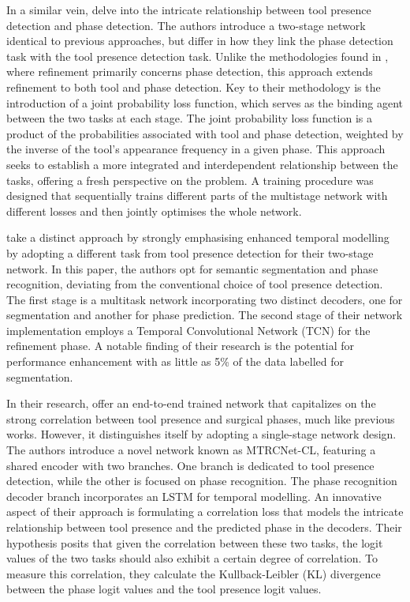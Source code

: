 \documentclass[times,twocolumn,final]{elsarticle}
\begin{document}
In a similar vein, \citet{multitask_connectionism} delve into the intricate relationship between tool presence detection and phase detection. The authors introduce a two-stage network identical to previous approaches, but \citet{multitask_connectionism} differ in how they link the phase detection task with the tool presence detection task.
Unlike the methodologies found in \citep{tecno,twinanda2016lstm,EndoNet}, where refinement primarily concerns phase detection, this approach extends refinement to both tool and phase detection.
Key to their methodology is the introduction of a joint probability loss function, which serves as the binding agent between the two tasks at each stage. The joint probability loss function is a product of the probabilities associated with tool and phase detection, weighted by the inverse of the tool's appearance frequency in a given phase. This approach seeks to establish a more integrated and interdependent relationship between the tasks, offering a fresh perspective on the problem. A training procedure was designed that sequentially trains different parts of the multistage network with different losses and then jointly optimises the whole network.

\citet{Sanchez-Matilla2022_data_centric} take a distinct approach by strongly emphasising enhanced temporal modelling by adopting a different task from tool presence detection for their two-stage network. In this paper, the authors opt for semantic segmentation and phase recognition, deviating from the conventional choice of tool presence detection.
The first stage is a multitask network incorporating two distinct decoders, one for segmentation and another for phase prediction. The second stage of their network implementation employs a Temporal Convolutional Network (TCN) for the refinement phase. A notable finding of their research is the potential for performance enhancement with as little as 5\% of the data labelled for segmentation.

In their research, \citet{multi_task_recurrent_conv} offer an end-to-end trained network that capitalizes on the strong correlation between tool presence and surgical phases, much like previous works. However, it distinguishes itself by adopting a single-stage network design.
The authors introduce a novel network known as MTRCNet-CL, featuring a shared encoder with two branches. One branch is dedicated to tool presence detection, while the other is focused on phase recognition. The phase recognition decoder branch incorporates an LSTM for temporal modelling.
An innovative aspect of their approach is formulating a correlation loss that models the intricate relationship between tool presence and the predicted phase in the decoders. Their hypothesis posits that given the correlation between these two tasks, the logit values of the two tasks should also exhibit a certain degree of correlation. To measure this correlation, they calculate the Kullback-Leibler (KL) divergence between the phase logit values and the tool presence logit values.
\end{document}
